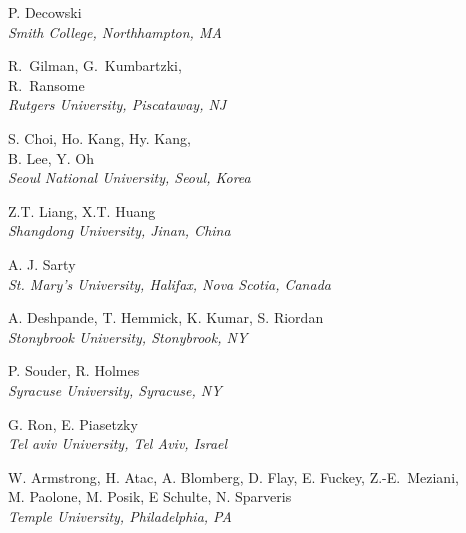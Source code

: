 \documentclass[12pt]{article}
\begin{document}
\begin{center}
\large{P. Decowski}\\ 
\it{Smith College, Northhampton, MA}  
\end{center}

\begin{center}
\large{R.~Gilman, G.~Kumbartzki, \\
  R.~Ransome}\\ 
\it{Rutgers University, Piscataway, NJ}  
\end{center}

\begin{center}
\large{S. Choi, Ho. Kang, Hy. Kang, \\
  B. Lee, Y. Oh}\\
\it{Seoul National University, Seoul, Korea}
\end{center}

\begin{center}
\large{Z.T. Liang, X.T. Huang}\\
\it{Shangdong University, Jinan, China}
\end{center}

\begin{center}
\large{A. J. Sarty}\\   
\it{St. Mary's University, Halifax, Nova Scotia, Canada}
\end{center}

\begin{center}
\large{A. Deshpande, T. Hemmick, K. Kumar, S. Riordan}\\   
\it{Stonybrook University, Stonybrook, NY}
\end{center}

\begin{center}
\large{P. Souder, R. Holmes}\\   
\it{Syracuse University, Syracuse, NY}
\end{center}

\begin{center}
\large{G. Ron, E. Piasetzky}\\
\it{Tel aviv University, Tel Aviv, Israel}
\end{center}

\begin{center}
\large{W. Armstrong, H. Atac, A. Blomberg, D. Flay, E. Fuckey, Z.-E.~Meziani, \\
  M. Paolone, M. Posik, E Schulte, N. Sparveris}\\
\it{Temple University, Philadelphia, PA}
\end{center}
\end{document}
